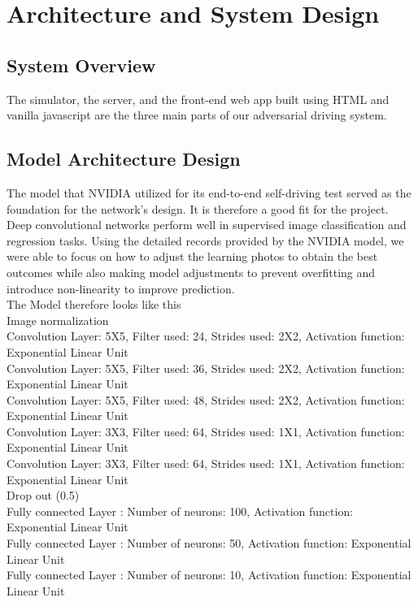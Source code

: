 \documentclass[ 12pt,a4paper,twocolumn,fleqn]{article}
\begin{document}
\section{Architecture and System Design}
\subsection{System Overview}
The simulator, the server, and the front-end web app built using HTML and vanilla javascript are the three main parts of our adversarial driving system. 
\subsection{Model Architecture Design}
The model that NVIDIA utilized for its end-to-end self-driving test served as the foundation for the network's design. It is therefore a good fit for the project.\\
Deep convolutional networks perform well in supervised image classification and regression tasks. Using the detailed records provided by the NVIDIA model, we were able to focus on how to adjust the learning photos to obtain the best outcomes while also making model adjustments to prevent overfitting and introduce non-linearity to improve prediction.\\
The Model therefore looks like this \\
Image normalization\\
Convolution Layer: 5X5, Filter used: 24, Strides used: 2X2, Activation function: Exponential Linear Unit\\
Convolution Layer: 5X5, Filter used: 36, Strides used: 2X2, Activation function: Exponential Linear Unit\\
Convolution Layer: 5X5, Filter used: 48, Strides used: 2X2, Activation function: Exponential Linear Unit\\
Convolution Layer: 3X3, Filter used: 64, Strides used: 1X1, Activation function: Exponential Linear Unit\\
Convolution Layer: 3X3, Filter used: 64, Strides used: 1X1, Activation function: Exponential Linear Unit\\
Drop out (0.5)\\
Fully connected Layer : Number of neurons: 100, Activation function: Exponential Linear Unit\\
Fully connected Layer : Number of neurons: 50, Activation function: Exponential Linear Unit\\
Fully connected Layer : Number of neurons: 10, Activation function: Exponential Linear Unit\\
\end{document}
